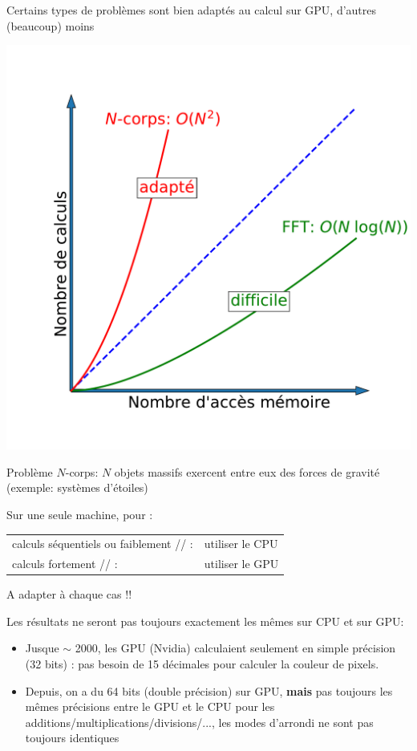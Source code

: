 \documentclass[usenames,dvipsnames]{beamer}
\begin{document}
\begin{frame}
	Certains types de problèmes sont bien adaptés au calcul sur GPU, d'autres (beaucoup) moins
	
	\includegraphics[scale=0.28]{../../Images/GPU_algos}
	
	Problème $N$-corps: $N$ objets massifs exercent entre eux des forces de gravité (exemple: systèmes d'étoiles)
	
\end{frame}

\begin{frame}
Sur une seule machine, pour :
\begin{tabular}{ll}
calculs séquentiels ou faiblement // :& utiliser le CPU \\
calculs fortement // :& utiliser le GPU
\end{tabular}

\vfill

A adapter à chaque cas !!

\vfill

Les résultats ne seront pas toujours exactement les mêmes sur CPU et sur GPU:
\begin{itemize}
\item Jusque $\sim$ 2000, les GPU (Nvidia) calculaient seulement en simple précision (32 bits) : pas besoin de 15 décimales pour calculer la couleur de pixels.
\item Depuis, on a du 64 bits (double précision) sur GPU, {\bfseries mais} pas toujours les mêmes précisions entre le GPU et le CPU pour les additions/multiplications/divisions/..., les modes d'arrondi ne sont pas toujours identiques
\end{itemize}

\end{frame}
\end{document}
